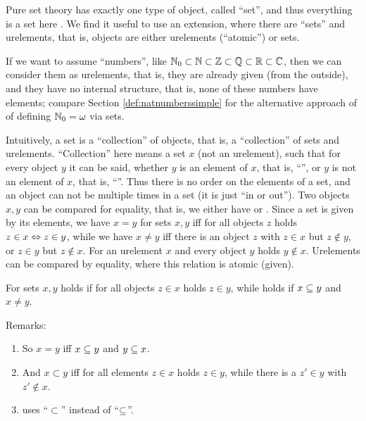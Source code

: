 \documentclass[12pt]{book}
\begin{document}
Pure set theory has exactly one type of object, called ``set'', and thus everything is a set here  \cite{h1}. We find it useful to use an 
extension, where there are ``sets'' and urelements, that is, objects are either urelements (``atomic'') or sets.
\begin{examp}\label{exp:urelemente}
      If we want to assume ``numbers'', like $\mathbb{N}_0 \subset \mathbb{N} \subset \mathbb{Z} \subset \mathbb{Q} \subset \mathbb{R} \subset \mathbb{C}$, then we can consider them 
	  as urelements, that is, they are already given (from the outside), and they have no internal structure, that is, none of these numbers 
	  have elements; compare Section \ref{def:natnumberssimple} for the alternative approach of of defining $\mathbb{N}_0 = \omega$ via sets.
\end{examp}
Intuitively, a set is a ``collection'' of objects, that is, a ``collection'' of sets and urelements. ``Collection'' here means a set $x$ 
(not an urelement), such that for every object $y$ it can be said, whether $y$ is an element of $x$, that is, ``'', or $y$ is 
not an element of $x$, that is, ``''. Thus there is no order on the elements of a set, and an object can not be multiple 
times in a set (it is just ``in or out''). Two objects $x, y$ can be compared for equality, that is, we either have  or . 
Since a set is given by its elements, we have $x = y$ for sets $x, y$ iff for all objects $z$ holds $z \in x \Leftrightarrow z \in y$, while we have $x \ne y$ 
iff there is an object $z$ with $z \in x$ but $z \notin y$, or $z \in y$ but $z \notin x$. For an urelement $x$ and every object $y$ holds $y \notin x$. 
Urelements can be compared by equality, where this relation is atomic (given).

\begin{defi}\label{def:sse}
      For sets $x, y$ holds  if for all objects $z \in x$ holds $z \in y$, while  holds if $x \subseteq y$ and $x \ne y$.
\end{defi}

Remarks:
\begin{enumerate}
      \item So $x = y$ iff $x \subseteq y$ and $y \subseteq x$.
      \item And $x \subset y$ iff for all elements $z \in x$ holds $z \in y$, while there is a $z' \in y$ with $z' \notin x$.
      \item \cite{h2} uses ``$\subset$'' instead of ``$\subseteq$''.
\end{enumerate}
\end{document}
